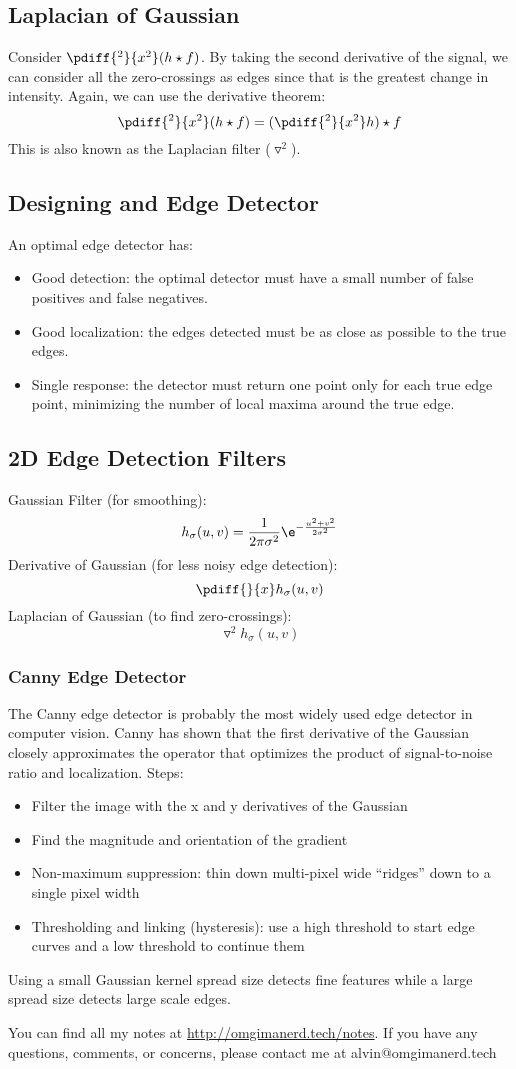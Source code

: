 \documentclass{math}
\begin{document}
\subsection*{Laplacian of Gaussian}
Consider \( \pdiff{^2}{x^2}(h\star f) \). By taking the second derivative of the
signal, we can consider all the zero-crossings as edges since that is the
greatest change in intensity. Again, we can use the derivative theorem:
\[ \pdiff{^2}{x^2}(h\star f) = (\pdiff{^2}{x^2}h)\star f \]
This is also known as the Laplacian filter (\( \triangledown^2 \)).

\subsection*{Designing and Edge Detector}
An optimal edge detector has:
\begin{itemize}
  \item Good detection: the optimal detector must have a small number of false
    positives and false negatives.
  \item Good localization: the edges detected must be as close as possible to
    the true edges.
  \item Single response: the detector must return one point only for each true
    edge point, minimizing the number of local maxima around the true edge.
\end{itemize}

\subsection*{2D Edge Detection Filters}
Gaussian Filter (for smoothing):
\[ h_{\sigma}(u,v) = \frac{1}{2\pi\sigma^2}\e^{-\frac{u^2+v^2}{2\sigma^2}} \]
Derivative of Gaussian (for less noisy edge detection):
\[ \pdiff{}{x}h_{\sigma}(u,v) \]
Laplacian of Gaussian (to find zero-crossings):
\[ \triangledown^2h_{\sigma}(u,v) \]

\subsubsection*{Canny Edge Detector}
The Canny edge detector is probably the most widely used edge detector in
computer vision. Canny has shown that the first derivative of the Gaussian
closely approximates the operator that optimizes the product of signal-to-noise
ratio and localization. Steps:
\begin{itemize}
  \item Filter the image with the x and y derivatives of the Gaussian
  \item Find the magnitude and orientation of the gradient
  \item Non-maximum suppression: thin down multi-pixel wide ``ridges'' down to
    a single pixel width
  \item Thresholding and linking (hysteresis): use a high threshold to start
    edge curves and a low threshold to continue them
\end{itemize}
Using a small Gaussian kernel spread size detects fine features while a large
spread size detects large scale edges.

\begin{center}
  You can find all my notes at \url{http://omgimanerd.tech/notes}. If you have
  any questions, comments, or concerns, please contact me at
  alvin@omgimanerd.tech
\end{center}
\end{document}
